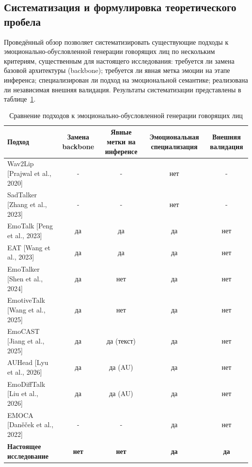 \documentclass[a4paper, 12pt, oneside, openany]{article}
\begin{document}
\subsection{Систематизация и формулировка теоретического пробела}

Проведённый обзор позволяет систематизировать существующие подходы к эмоционально-обусловленной генерации говорящих лиц по нескольким критериям, существенным для настоящего исследования: требуется ли замена базовой архитектуры (backbone); требуется ли явная метка эмоции на этапе инференса; специализирован ли подход на эмоциональной семантике; реализована ли независимая внешняя валидация. Результаты систематизации представлены в таблице~\ref{tab:approaches_comparison}.

\renewcommand{\arraystretch}{1.3}
\renewcommand{\tabcolsep}{0.15cm}
\begin{table}[H]
\caption{Сравнение подходов к эмоционально-обусловленной генерации говорящих лиц}
\label{tab:approaches_comparison}
\centering
\small
\begin{tabular}{|p{4.5cm}|c|c|c|c|}
\hline
\textbf{Подход} & \textbf{Замена backbone} & \textbf{Явные метки на инференсе} & \textbf{Эмоциональная специализация} & \textbf{Внешняя валидация} \\
\hline
Wav2Lip [Prajwal et al., 2020] & - & - & нет & - \\
\hline
SadTalker [Zhang et al., 2023] & - & - & нет & - \\
\hline
EmoTalk [Peng et al., 2023] & да & да & да & нет \\
\hline
EAT [Wang et al., 2023] & да & да & да & нет \\
\hline
EmoTalker [Shen et al., 2024] & да & нет & да & нет \\
\hline
EmotiveTalk [Wang et al., 2025] & да & нет & да & нет \\
\hline
EmoCAST [Jiang et al., 2025] & да & да (текст) & да & нет \\
\hline
AUHead [Lyu et al., 2026] & да & да (AU) & да & нет \\
\hline
EmoDiffTalk [Liu et al., 2026] & да & да (AU) & да & нет \\
\hline
EMOCA [Daněček et al., 2022] & - & - & да & нет \\
\hline
\textbf{Настоящее исследование} & \textbf{нет} & \textbf{нет} & \textbf{да} & \textbf{да} \\
\hline
\end{tabular}
\end{table}
\end{document}

